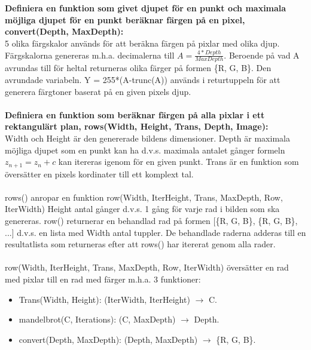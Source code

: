\documentclass[a4paper, 11pt]{article}
\begin{document}
\\\\\textbf{Definiera en funktion som givet djupet för en punkt och maximala möjliga djupet för en punkt beräknar färgen på en pixel, convert(Depth, MaxDepth):}
\\5 olika färgskalor används för att beräkna färgen på pixlar med olika djup. Färgskalorna genereras m.h.a. decimalerna till \begin{math} A=\frac{4*Depth}{MaxDepth} \end{math}. Beroende på vad A avrundas till för heltal returneras olika färger på formen \{R, G, B\}. Den avrundade variabeln. Y = 255*(A-trunc(A)) används i returtuppeln för att generera färgtoner baserat på en given pixels djup. 
\\\\\textbf{Definiera en funktion som beräknar färgen på alla pixlar i ett rektangulärt plan, rows(Width, Height, Trans, Depth, Image):}
\\Width och Height är den genererade bildens dimensioner. Depth är maximala möjliga djupet som en punkt kan ha d.v.s. maximala antalet gånger formeln \begin{math} z_{n+1} = z_{n} + c \end{math} kan itereras igenom för en given punkt. Trans är en funktion som översätter en pixels kordinater till ett komplext tal. 
\\\\rows() anropar en funktion row(Width, IterHeight, Trans, MaxDepth, Row, IterWidth) Height antal gånger d.v.s. 1 gång för varje rad i bilden som ska genereras. row() returnerar en behandlad rad på formen [\{R, G, B\}, \{R, G, B\}, ...] d.v.s. en lista med Width antal tuppler. De behandlade raderna adderas till en resultatlista som returneras efter att rows() har itererat genom alla rader. 
\\\\row(Width, IterHeight, Trans, MaxDepth, Row, IterWidth) översätter en rad med pixlar till en rad med färger m.h.a. 3 funktioner: 
\begin{itemize}
 \item Trans(Width, Height): (IterWidth, IterHeight) \begin{math} \rightarrow \end{math} C. 
 \item mandelbrot(C, Iterations): (C, MaxDepth) \begin{math} \rightarrow \end{math} Depth. 
 \item convert(Depth, MaxDepth): (Depth, MaxDepth) \begin{math} \rightarrow \end{math} \{R, G, B\}.  
\end{itemize}
\end{document}
